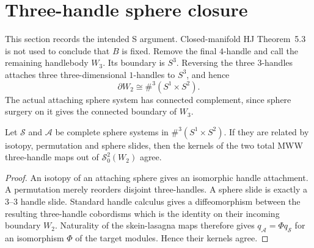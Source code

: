 \section{Three-handle sphere closure}\label{sec:s-closure}

This section records the intended S argument.  Closed-manifold HJ
Theorem~5.3 is not used to conclude that $B$ is fixed.  Remove the final $4$-handle and call the
remaining handlebody $W_3$.  Its boundary is $S^3$.  Reversing the three
$3$-handles attaches three three-dimensional $1$-handles to $S^3$, and hence
\[
\partial W_2\cong\#^3(S^1\times S^2).
\]
The actual attaching sphere system has connected complement, since sphere
surgery on it gives the connected boundary of $W_3$.

\begin{lemma}
\label{lem:Ssystem}
Let \(\mathcal S\) and \(\mathcal A\) be complete sphere systems in
\(\#^3(S^1\times S^2)\).  If they are related by isotopy, permutation and
sphere slides, then the kernels of the two total MWW three-handle maps out of
\(\mathcal S^2_0(W_2)\) agree.
\end{lemma}

\begin{proof}
An isotopy of an attaching sphere gives an isomorphic handle attachment.
A permutation merely reorders disjoint three-handles.  A sphere slide is
exactly a \(3\)--\(3\) handle slide.  Standard handle calculus gives a
diffeomorphism between the resulting three-handle cobordisms which is the
identity on their incoming boundary \(W_2\).  Naturality of the skein-lasagna
maps therefore gives \(q_{\mathcal A}=\Phi q_{\mathcal S}\) for an
isomorphism \(\Phi\) of the target modules.  Hence their kernels agree.
\end{proof}

